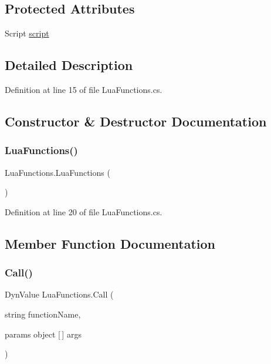 \subsection*{Protected Attributes}
\begin{DoxyCompactItemize}
\item 
Script \hyperlink{class_lua_functions_a4a3ad64c9593f35238cc445645f68771}{script}
\end{DoxyCompactItemize}


\subsection{Detailed Description}


Definition at line 15 of file Lua\+Functions.\+cs.



\subsection{Constructor \& Destructor Documentation}
\mbox{\label{class_lua_functions_ab3e8e3948a49cde556fa27f93a68d0db}} 
\subsubsection{\texorpdfstring{Lua\+Functions()}{LuaFunctions()}}
{\footnotesize\ttfamily Lua\+Functions.\+Lua\+Functions (\begin{DoxyParamCaption}{ }\end{DoxyParamCaption})}



Definition at line 20 of file Lua\+Functions.\+cs.



\subsection{Member Function Documentation}
\mbox{\label{class_lua_functions_a8662db102890d5b12fada540482c51eb}} 
\subsubsection{\texorpdfstring{Call()}{Call()}}
{\footnotesize\ttfamily Dyn\+Value Lua\+Functions.\+Call (\begin{DoxyParamCaption}\item[{string}]{function\+Name,  }\item[{params object \mbox{[}$\,$\mbox{]}}]{args }\end{DoxyParamCaption})}



